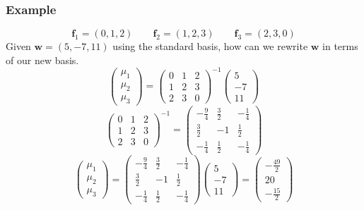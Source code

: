 \documentclass[12pt]{article}
\begin{document}
\subsubsection*{Example}
\[\textbf{f}_1=(0,1,2)\qquad \textbf{f}_2=(1,2,3)\qquad\textbf{f}_3=(2,3,0)\]
Given \(\textbf{w}=(5,-7,11)\) using the standard basis, how can we rewrite \(\textbf{w}\) in terms of our new basis.
\[\begin{pmatrix}
    \mu_1 \\
    \mu_2 \\
    \mu_3
\end{pmatrix}=\begin{pmatrix}
    0 & 1 & 2 \\
    1 & 2 & 3 \\
    2 & 3 & 0 
\end{pmatrix}^{-1}\begin{pmatrix}
    5 \\
    -7 \\
    11
\end{pmatrix}\]
\[\begin{pmatrix}
    0 & 1 & 2 \\
    1 & 2 & 3 \\
    2 & 3 & 0 
\end{pmatrix}^{-1}=\begin{pmatrix}
    -\frac{9}{4} & \frac{3}{2} & -\frac{1}{4} \\
    \frac{3}{2} & -1 & \frac{1}{2} \\
    -\frac{1}{4} & \frac{1}{2} & -\frac{1}{4} 
\end{pmatrix}\]
\[\begin{pmatrix}
    \mu_1 \\
    \mu_2 \\
    \mu_3
\end{pmatrix}=\begin{pmatrix}
    -\frac{9}{4} & \frac{3}{2} & -\frac{1}{4} \\
    \frac{3}{2} & -1 & \frac{1}{2} \\
    -\frac{1}{4} & \frac{1}{2} & -\frac{1}{4} 
\end{pmatrix}\begin{pmatrix}
    5 \\
    -7 \\
    11
\end{pmatrix}=\begin{pmatrix}
    -\frac{49}{2} \\
    20 \\
    -\frac{15}{2}
\end{pmatrix}\]
\end{document}
